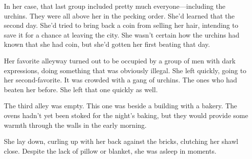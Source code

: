 In her case, that last group included pretty much everyone—including the urchins. They were all above her in the pecking order. She’d learned that the second day. She’d tried to bring back a coin from selling her hair, intending to save it for a chance at leaving the city. She wasn’t certain how the urchins had known that she had coin, but she’d gotten her first beating that day.

Her favorite alleyway turned out to be occupied by a group of men with dark expressions, doing something that was obviously illegal. She left quickly, going to her second-favorite. It was crowded with a gang of urchins. The ones who had beaten her before. She left that one quickly as well.

The third alley was empty. This one was beside a building with a bakery. The ovens hadn’t yet been stoked for the night’s baking, but they would provide some warmth through the walls in the early morning.

She lay down, curling up with her back against the bricks, clutching her shawl close. Despite the lack of pillow or blanket, she was asleep in moments.


